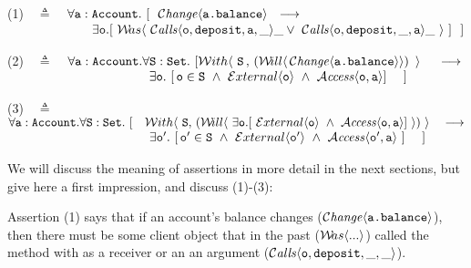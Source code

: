 
(1)\ \  $\triangleq$\ \ $\forall \prg{a}:\prg{Account}.\ [\ \  \Changes{\prg{a.balance}}  \ \    
    \longrightarrow \ \    \hfill$ \\
  $\strut \hspace{2.3cm} 
 \exists \prg{o}. [\  \Past{\ \Calls{\prg{o}}{\prg{deposit}}{\prg{a}}{\_}{\_} \vee\  \Calls{\prg{o}}{\prg{deposit}}{\_}{\prg{a}}{\_}\ } \ ] \ \ ] \hfill $

\vspace{.4cm}

    (2)\ \  $\triangleq$\ \ $\forall \prg{a}:\prg{Account}.\forall \prg{S}:\prg{Set}.\ [    \Using{(\Future{\,\Changes{\prg{a.balance}}})\,}{\prg{S}\,}\ \ \   \
    \longrightarrow$ \\
 $\strut \hspace{3.9cm} \hfill \exists \prg{o}.\ [\, \prg{o}\in \prg{S}\ \wedge\  \External{\prg{o}}  \ \wedge \ \CanAccess{\prg{o}}{\prg{a}}    ] \ \ \ \ ]$
\vspace{.4cm} 
 
     (3)\ \  $\triangleq$\ \ $\forall \prg{a}:\prg{Account}.\forall \prg{S}:\prg{Set}.\ [ \ \ \ {\Using{(\Future{\ \exists \prg{o}.[\ \External{\prg{o}} \ \wedge\ \CanAccess{\prg{o}}{\prg{a}}]\ })}{\SF}} \  \ \
    \longrightarrow$ \\
 $\strut \hspace{3.9cm} \hfill \exists \prg{o}'.\ [\, \prg{o}'\in \prg{S}\  \wedge  \ \External{\prg{o}'}  \ \wedge \ \CanAccess{\prg{o}'}{\prg{a}}   \ ] \ \ \ \ ]$

\vspace{.2cm}

We will discuss the meaning of  \Chainmail assertions in more detail in the next sections, but 
give here a first impression, and discuss (1)-(3):
 
Assertion (1) %
says that if   an account's balance changes
($\Changes{\prg{a.balance}}$),
then there must be some client object 
that in the past (${\Past{...}}$) called the  method with  as a receiver or an an argument 
($\Calls{\prg{o}} {\prg{deposit}} {\_} {\_}$).
 
